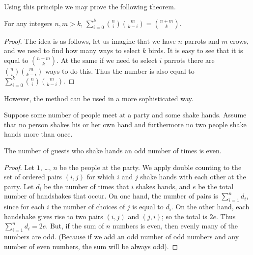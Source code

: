 Using this principle we may prove the following theorem.
\begin{theorem}
  For any integers $n, m > k$,
  $\sum_{i = 0}^k \binom{n}{i} \binom{m}{k - i} = \binom{n + m}{k}$.
\end{theorem}
\begin{proof}
  The idea is as follows, let us imagine that we have $n$ parrots and $m$ crows,
  and we need to find how many ways to select $k$ birds.
  It is easy to see that it is equal to $\binom{n + m}{k}$. At the same
  if we need to select $i$ parrots there are $\binom{n}{i}\binom{m}{k - i}$
  ways to do this. Thus the number is also equal to
  $\sum_{i = 0}^k \binom{n}{i}\binom{m}{k - i}$.
\end{proof}

However, the method can be used in a more sophisticated way.
\begin{lemma}
\label{lemma:handshaking}
  Suppose some number of people meet at a party and some shake hands. Assume
  that no person shakes his or her own hand and furthermore no two people shake
  hands more than once.

  The number of guests who shake hands an odd number of times is even.
\end{lemma}
\begin{proof}
  Let $1$, \dots, $n$ be the people at the party. We apply double counting to
  the set of ordered pairs $(i, j)$ for which $i$ and $j$ shake hands with each
  other at the party. Let $d_i$ be the number of times that $i$ shakes hands,
  and $e$ be the total number of handshakes that occur. On one hand, the number
  of pairs is $\sum_{i = 1}^n d_i$, since for each $i$ the number of choices of
  $j$ is equal to $d_i$. On the other hand, each handshake gives rise to two
  pairs $(i, j)$ and $(j, i)$; so the total is $2e$.
  Thus $\sum_{i = 1}^n d_i = 2e$. But, if the sum of $n$ numbers is even, then
  evenly many of the numbers are odd.
  (Because if we add an odd number of odd numbers and any number of even
  numbers, the sum will be always odd).
\end{proof}



